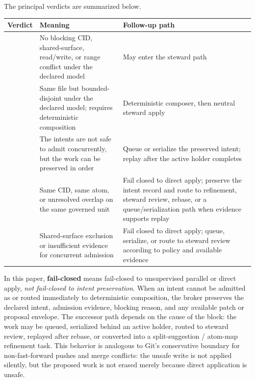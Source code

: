 \documentclass[9pt,letterpaper]{extarticle}
\newcommand{\TableLargeFont}{\fontsize{8.8}{10.0}\selectfont}
\newcommand{\TableLead}[1]{\par\smallskip\noindent{\raggedright\small\bfseries #1\par}\smallskip}
\begin{document}
The principal verdicts are summarized below.

\begin{table}[!b]
\TableLead{Table 4 --- Broker Verdicts and Follow-Up Paths.}
\raggedright
\TableLargeFont
\setlength{\tabcolsep}{3pt}
\begin{tabular}{@{}L{0.22\textwidth}L{0.25\textwidth}L{0.47\textwidth}@{}}
\toprule
Verdict & Meaning & Follow-up path \\
\midrule
\texttt{} & No blocking CID, shared-surface, read/write, or range conflict under the declared model & May enter the steward path \\
\texttt{} & Same file but bounded-disjoint under the declared model; requires deterministic composition & Deterministic composer, then neutral steward apply \\
\texttt{} & The intents are not safe to admit concurrently, but the work can be preserved in order & Queue or serialize the preserved intent; replay after the active holder completes \\
\texttt{} & Same CID, same atom, or unresolved overlap on the same governed unit & Fail closed to direct apply; preserve the intent record and route to refinement, steward review, rebase, or a queue/serialization path when evidence supports replay \\
\texttt{} & Shared-surface exclusion or insufficient evidence for concurrent admission & Fail closed to direct apply; queue, serialize, or route to steward review according to policy and available evidence \\
\bottomrule
\end{tabular}
\end{table}

In this paper, \textbf{fail-closed} means fail-closed to unsupervised parallel or direct apply, \emph{not fail-closed to intent preservation}. When an intent cannot be admitted as \texttt{} or routed immediately to deterministic composition, the broker preserves the declared intent, admission evidence, blocking reason, and any available patch or proposal envelope. The successor path depends on the cause of the block: the work may be queued, serialized behind an active holder, routed to steward review, replayed after rebase, or converted into a split-suggestion / atom-map refinement task. This behavior is analogous to Git's conservative boundary for non-fast-forward pushes and merge conflicts: the unsafe write is not applied silently, but the proposed work is not erased merely because direct application is unsafe.
\end{document}
